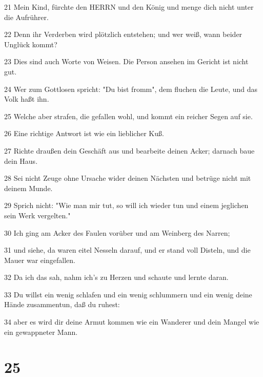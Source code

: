 \par 21 Mein Kind, fürchte den HERRN und den König und menge dich nicht unter die Aufrührer.
\par 22 Denn ihr Verderben wird plötzlich entstehen; und wer weiß, wann beider Unglück kommt?
\par 23 Dies sind auch Worte von Weisen. Die Person ansehen im Gericht ist nicht gut.
\par 24 Wer zum Gottlosen spricht: "Du bist fromm", dem fluchen die Leute, und das Volk haßt ihn.
\par 25 Welche aber strafen, die gefallen wohl, und kommt ein reicher Segen auf sie.
\par 26 Eine richtige Antwort ist wie ein lieblicher Kuß.
\par 27 Richte draußen dein Geschäft aus und bearbeite deinen Acker; darnach baue dein Haus.
\par 28 Sei nicht Zeuge ohne Ursache wider deinen Nächsten und betrüge nicht mit deinem Munde.
\par 29 Sprich nicht: "Wie man mir tut, so will ich wieder tun und einem jeglichen sein Werk vergelten."
\par 30 Ich ging am Acker des Faulen vorüber und am Weinberg des Narren;
\par 31 und siehe, da waren eitel Nesseln darauf, und er stand voll Disteln, und die Mauer war eingefallen.
\par 32 Da ich das sah, nahm ich's zu Herzen und schaute und lernte daran.
\par 33 Du willst ein wenig schlafen und ein wenig schlummern und ein wenig deine Hände zusammentun, daß du ruhest:
\par 34 aber es wird dir deine Armut kommen wie ein Wanderer und dein Mangel wie ein gewappneter Mann.

\chapter{25}

